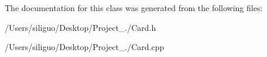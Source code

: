 The documentation for this class was generated from the following files\+:\begin{DoxyCompactItemize}
\item 
/\+Users/siliguo/\+Desktop/\+Project\+\_./Card.\+h\item 
/\+Users/siliguo/\+Desktop/\+Project\+\_./Card.\+cpp\end{DoxyCompactItemize}
